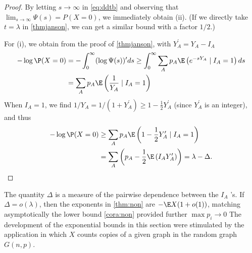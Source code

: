 \documentclass{article}
\begin{document}
\begin{proof}
By letting $s \rightarrow \infty$ in \cref{eq:ddtb} and observing that $\lim _{s \rightarrow \infty} \Psi(s)= P (X=0)$, we immediately obtain (ii). (If we directly take $t=\lambda$ in \cref{thmjanson}, we can get a similar bound with a factor $1/2$.)

For (i), we obtain from the proof of  \cref{thmjanson}, with $Y_{A}^{\prime}=Y_{A}-I_{A}$
\begin{align*}
\begin{aligned}
-\log \P (X=0) &=-\int_{0}^{\infty}(\log \Psi(s))^{\prime} d s \geq \int_{0}^{\infty} \sum_{A} p_{A} \E \left(e^{-s Y_{A}} \mid I_{A}=1\right) d s \\
&=\sum_{A} p_{A} \E \left(\frac{1}{Y_{A}} \mid I_{A}=1\right)
\end{aligned}
\end{align*}
When $I_{A}=1$, we find $1 / Y_{A}=1 /\left(1+Y_{A}^{\prime}\right) \geq 1-\frac{1}{2} Y_{A}^{\prime}$ (since $Y_{A}^{\prime}$ is an integer), and thus
\begin{align*}
\begin{aligned}
-\log \P (X=0) & \geq \sum_{A} p_{A} \E \left(1-\frac{1}{2} Y_{A}^{\prime} \mid I_{A}=1\right) \\
&=\sum_{A}\left(p_{A}-\frac{1}{2} \E \left(I_{A} Y_{A}^{\prime}\right)\right)=\lambda-\Delta .
\end{aligned}
\end{align*}
\end{proof}
\begin{rema}
 The quantity $\Delta$ is a measure of the pairwise dependence between the $I_{A}$ 's. If $\Delta=o(\lambda)$, then the exponents in \cref{thm:non} are $- \E X(1+o(1))$, matching asymptotically the lower bound \cref{cora:non} provided further $\max p_{i} \rightarrow 0$
The development of the exponential bounds in this section were stimulated by the application in which $X$ counts copies of a given graph in the random graph $G (n, p)$.
\end{rema}





\end{document}
